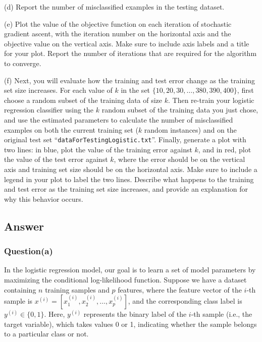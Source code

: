 \documentclass[a4paper, utf8]{ctexart}
\begin{document}
	\vspace{.5em}
	
	(d) Report the number of misclassified examples in the testing dataset.
	
	\vspace{.5em}
	
	(e) Plot the value of the objective function on each iteration of stochastic gradient ascent, with the iteration number on the horizontal axis and the objective value on the vertical axis. Make sure to include axis labels and a title for your plot. Report the number of iterations that are required for the algorithm to converge. 
	
	\vspace{.5em}
	
	(f) Next, you will evaluate how the training and test error change as the training set size increases. For each value of $k$ in the set $\{10, 20, 30, \ldots, 380, 390, 400\}$, first choose a random subset of the training data of size $k$.  Then re-train your logistic regression classifier using the $k$ random subset of the training data you just chose, and use the estimated parameters to calculate the number of misclassified examples on both the current training set ($k$ random instances) and on the original test set ``\verb|dataForTestingLogistic.txt|''. Finally, generate a plot with two lines: in blue, plot the value of the training error against $k$, and in red, plot the value of the test error against $k$, where the error should be on the vertical axis and training set size should be on the horizontal axis. Make sure to include a legend in your plot to label the two lines. Describe what happens to the training and test error as the training set size increases, and provide an explanation for why this behavior occurs.
	
	\subsection{Answer}
	
	\subsubsection{Question(a)}
	
	In the logistic regression model, our goal is to learn a set of model parameters by maximizing the conditional log-likelihood function. Suppose we have a dataset containing $ n $ training samples and $ p $ features, where the feature vector of the $ i $-th sample is $ x^{(i)} = [x^{(i)}_1, x^{(i)}_2, \dots, x^{(i)}_p] $, and the corresponding class label is $ y^{(i)} \in \{0, 1\} $. Here, $ y^{(i)} $ represents the binary label of the $ i $-th sample (i.e., the target variable), which takes values 0 or 1, indicating whether the sample belongs to a particular class or not.
	
\end{document}
